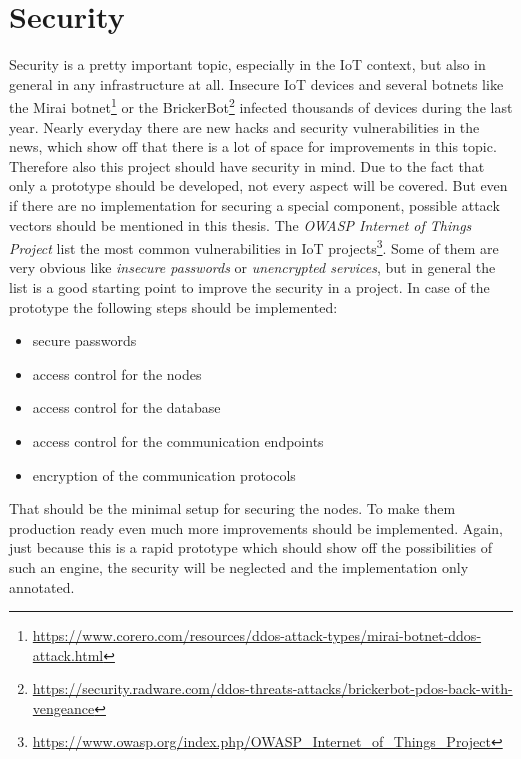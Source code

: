 \section{Security}
Security is a pretty important topic, especially in the \ac{IoT} context, but also in general in any infrastructure at all.
Insecure \ac{IoT} devices and several botnets like the Mirai botnet\footnote{\url{https://www.corero.com/resources/ddos-attack-types/mirai-botnet-ddos-attack.html}} or the BrickerBot\footnote{\url{https://security.radware.com/ddos-threats-attacks/brickerbot-pdos-back-with-vengeance}} infected thousands of devices during the last year.
Nearly everyday there are new hacks and security vulnerabilities in the news, which show off that there is a lot of space for improvements in this topic.
Therefore also this project should have security in mind.
Due to the fact that only a prototype should be developed, not every aspect will be covered.
But even if there are no implementation for securing a special component, possible attack vectors should be mentioned in this thesis.
The \textit{OWASP Internet of Things Project} list the most common vulnerabilities in \ac{IoT} projects\footnote{\url{https://www.owasp.org/index.php/OWASP_Internet_of_Things_Project}}.
Some of them are very obvious like \textit{insecure passwords} or \textit{unencrypted services}, but in general the list is a good starting point to improve the security in a project.
In case of the prototype the following steps should be implemented:
\begin{itemize}
  \item secure passwords
  \item access control for the nodes
  \item access control for the database
  \item access control for the communication endpoints
  \item encryption of the communication protocols
\end{itemize}

That should be the minimal setup for securing the nodes.
To make them production ready even much more improvements should be implemented.
Again, just because this is a rapid prototype which should show off the possibilities of such an engine, the security will be neglected and the implementation only annotated.


